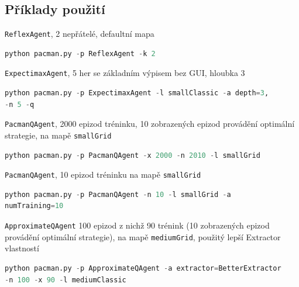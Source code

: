 \subsection{Příklady použití}
\texttt{ReflexAgent}, 2 nepřátelé, defaultní mapa
\begin{lstlisting}[language=Python,texcl=true]
python pacman.py -p ReflexAgent -k 2
\end{lstlisting}
\texttt{ExpectimaxAgent}, 5 her se základním výpisem bez GUI, hloubka 3
\begin{lstlisting}[language=Python,texcl=true]
python pacman.py -p ExpectimaxAgent -l smallClassic -a depth=3,
-n 5 -q
\end{lstlisting}
\texttt{PacmanQAgent}, 2000 epizod tréninku, 10 zobrazených epizod provádění optimální strategie, na mapě \texttt{smallGrid}
\begin{lstlisting}[language=Python,texcl=true]
python pacman.py -p PacmanQAgent -x 2000 -n 2010 -l smallGrid
\end{lstlisting}
\texttt{PacmanQAgent}, 10 epizod tréninku na mapě \texttt{smallGrid}
\begin{lstlisting}[language=Python,texcl=true]
python pacman.py -p PacmanQAgent -n 10 -l smallGrid -a
numTraining=10
\end{lstlisting}
\texttt{ApproximateQAgent} 100 epizod z nichž 90 trénink (10 zobrazených epizod provádění optimální strategie), na mapě \texttt{mediumGrid}, použitý lepší Extractor vlastností
\begin{lstlisting}[language=Python,texcl=true]
python pacman.py -p ApproximateQAgent -a extractor=BetterExtractor
-n 100 -x 90 -l mediumClassic
\end{lstlisting}

